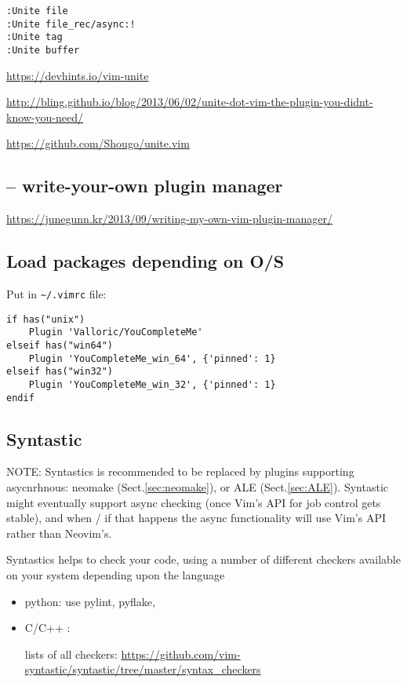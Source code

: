 \begin{verbatim}
:Unite file
:Unite file_rec/async:!
:Unite tag
:Unite buffer
\end{verbatim}

\url{https://devhints.io/vim-unite}

\url{http://bling.github.io/blog/2013/06/02/unite-dot-vim-the-plugin-you-didnt-know-you-need/}

\url{https://github.com/Shougo/unite.vim}

\subsection{-- write-your-own plugin manager}

\url{https://junegunn.kr/2013/09/writing-my-own-vim-plugin-manager/}

\subsection{Load packages depending on O/S}

Put in \verb!~/.vimrc! file:
\begin{verbatim}
if has("unix")
    Plugin 'Valloric/YouCompleteMe'
elseif has("win64")
    Plugin 'YouCompleteMe_win_64', {'pinned': 1}
elseif has("win32")
    Plugin 'YouCompleteMe_win_32', {'pinned': 1}
endif
\end{verbatim}


\subsection{Syntastic}
\label{sec:Syntastic}

NOTE: Syntastics is recommended to be replaced by plugins supporting
asycnrhnous: neomake (Sect.\ref{sec:neomake}), or ALE (Sect.\ref{sec:ALE}).
Syntastic might eventually support async checking (once Vim's API for job
control gets stable), and when / if that happens the async functionality will
use Vim's API rather than Neovim's.  

Syntastics helps to check your code, using a number of different checkers
available on your system depending upon the language
\begin{itemize}
  \item python: use pylint, pyflake, 
  
  \item C/C++ : 

lists of all checkers:
\url{https://github.com/vim-syntastic/syntastic/tree/master/syntax_checkers}

\end{itemize}

